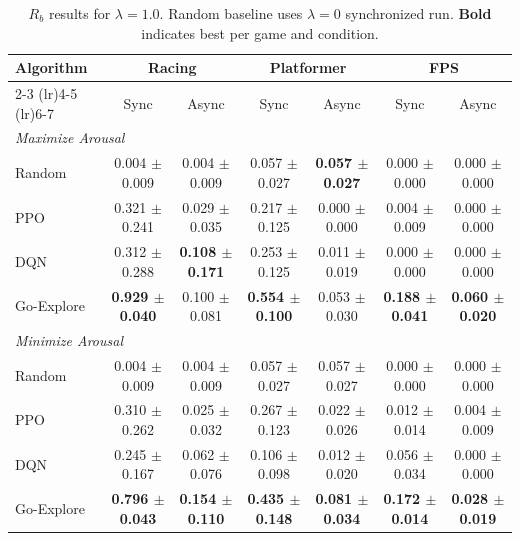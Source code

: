 \begin{table}[ht]
\centering
\caption{$R_b$ results for $\lambda=1.0$. Random baseline uses $\lambda=0$ synchronized run. \textbf{Bold} indicates best per game and condition.}
\label{tab:rb_lambda1}
\begin{tabular}{lcccccc}
\toprule
Algorithm & \multicolumn{2}{c}{Racing} & \multicolumn{2}{c}{Platformer} & \multicolumn{2}{c}{FPS} \\
\cmidrule(lr){2-3} \cmidrule(lr){4-5} \cmidrule(lr){6-7}
 & Sync & Async & Sync & Async & Sync & Async \\
\midrule
\multicolumn{7}{l}{\textit{Maximize Arousal}} \\
\midrule
Random & 0.004 $\pm$ 0.009 & 0.004 $\pm$ 0.009 & 0.057 $\pm$ 0.027 & \textbf{0.057 $\pm$ 0.027} & 0.000 $\pm$ 0.000 & 0.000 $\pm$ 0.000 \\
PPO & 0.321 $\pm$ 0.241 & 0.029 $\pm$ 0.035 & 0.217 $\pm$ 0.125 & 0.000 $\pm$ 0.000 & 0.004 $\pm$ 0.009 & 0.000 $\pm$ 0.000 \\
DQN & 0.312 $\pm$ 0.288 & \textbf{0.108 $\pm$ 0.171} & 0.253 $\pm$ 0.125 & 0.011 $\pm$ 0.019 & 0.000 $\pm$ 0.000 & 0.000 $\pm$ 0.000 \\
Go-Explore & \textbf{0.929 $\pm$ 0.040} & 0.100 $\pm$ 0.081 & \textbf{0.554 $\pm$ 0.100} & 0.053 $\pm$ 0.030 & \textbf{0.188 $\pm$ 0.041} & \textbf{0.060 $\pm$ 0.020} \\
\midrule
\multicolumn{7}{l}{\textit{Minimize Arousal}} \\
\midrule
Random & 0.004 $\pm$ 0.009 & 0.004 $\pm$ 0.009 & 0.057 $\pm$ 0.027 & 0.057 $\pm$ 0.027 & 0.000 $\pm$ 0.000 & 0.000 $\pm$ 0.000 \\
PPO & 0.310 $\pm$ 0.262 & 0.025 $\pm$ 0.032 & 0.267 $\pm$ 0.123 & 0.022 $\pm$ 0.026 & 0.012 $\pm$ 0.014 & 0.004 $\pm$ 0.009 \\
DQN & 0.245 $\pm$ 0.167 & 0.062 $\pm$ 0.076 & 0.106 $\pm$ 0.098 & 0.012 $\pm$ 0.020 & 0.056 $\pm$ 0.034 & 0.000 $\pm$ 0.000 \\
Go-Explore & \textbf{0.796 $\pm$ 0.043} & \textbf{0.154 $\pm$ 0.110} & \textbf{0.435 $\pm$ 0.148} & \textbf{0.081 $\pm$ 0.034} & \textbf{0.172 $\pm$ 0.014} & \textbf{0.028 $\pm$ 0.019} \\
\bottomrule
\end{tabular}
\end{table}
